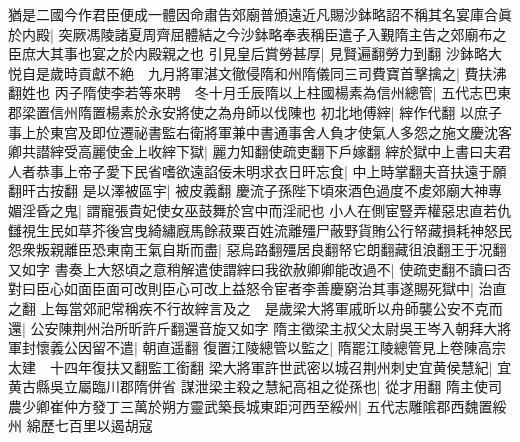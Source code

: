 猶是二國今作君臣便成一體因命肅告郊廟普頒遠近凡賜沙鉢略詔不稱其名宴庫合眞於内殿|{
	突厥馮陵諸夏周齊屈體結之今沙鉢略奉表稱臣遣子入覲隋主告之郊廟布之臣庶大其事也宴之於内殿親之也}
引見皇后賞勞甚厚|{
	見賢遍翻勞力到翻}
沙鉢略大悦自是歲時貢獻不絶　九月將軍湛文徹侵隋和州隋儀同三司費寶首擊擒之|{
	費扶沸翻姓也}
丙子隋使李若等來聘　冬十月壬辰隋以上柱國楊素為信州總管|{
	五代志巴東郡梁置信州隋置楊素於永安將使之為舟師以伐陳也}
初北地傅縡|{
	縡作代翻}
以庶子事上於東宫及即位遷祕書監右衛將軍兼中書通事舍人負才使氣人多怨之施文慶沈客卿共譛縡受高麗使金上收縡下獄|{
	麗力知翻使疏吏翻下戶嫁翻}
縡於獄中上書曰夫君人者恭事上帝子愛下民省嗜欲遠諂佞未明求衣日旰忘食|{
	中上時掌翻夫音扶遠于願翻旰古按翻}
是以澤被區宇|{
	被皮義翻}
慶流子孫陛下頃來酒色過度不䖍郊廟大神專媚淫昏之鬼|{
	謂寵張貴妃使女巫鼓舞於宫中而淫祀也}
小人在側宦豎弄權惡忠直若仇讎視生民如草芥後宫曳綺繡廐馬餘菽粟百姓流離殭尸蔽野貨賄公行帑藏損耗神怒民怨衆叛親離臣恐東南王氣自斯而盡|{
	惡烏路翻殭居良翻帑它朗翻藏徂浪翻王于况翻又如字}
書奏上大怒頃之意稍解遣使謂縡曰我欲赦卿卿能改過不|{
	使疏吏翻不讀曰否}
對曰臣心如面臣面可改則臣心可改上益怒令宦者李善慶窮治其事遂賜死獄中|{
	治直之翻}
上每當郊祀常稱疾不行故縡言及之　是歲梁大將軍戚昕以舟師襲公安不克而還|{
	公安陳荆州治所昕許斤翻還音旋又如字}
隋主徵梁主叔父太尉吳王岑入朝拜大將軍封懷義公因留不遣|{
	朝直遥翻}
復置江陵總管以監之|{
	隋罷江陵總管見上卷陳高宗太建　十四年復扶又翻監工銜翻}
梁大將軍許世武密以城召荆州刺史宜黄侯慧紀|{
	宜黄古縣吳立屬臨川郡隋併省}
謀泄梁主殺之慧紀高祖之從孫也|{
	從才用翻}
隋主使司農少卿崔仲方發丁三萬於朔方靈武築長城東距河西至綏州|{
	五代志雕隂郡西魏置綏州}
綿歷七百里以遏胡寇

